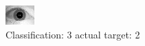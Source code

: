 \begin{figure}[h!]
\begin{center}
\includegraphics[width=0.60\columnwidth]{figures/ID1647_class_3_target_2.png}
\end{center}
\caption{ Classification: 3 actual target: 2}
\label{fig:ID1647_class_3_target_2}
\end{figure}
